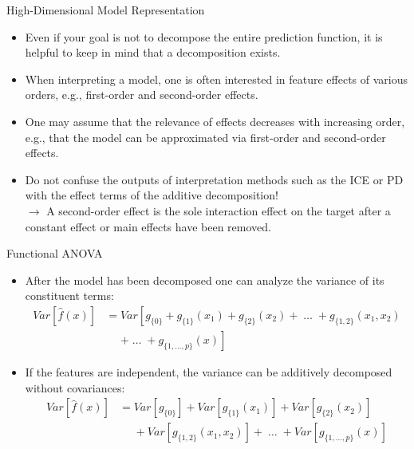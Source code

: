 \documentclass[11pt,compress,t,notes=noshow, aspectratio=169, xcolor=table]{beamer}
\begin{document}
\begin{frame}{High-Dimensional Model Representation}

\begin{itemize}
\itemsep2em
    \item Even if your goal is not to decompose the entire prediction function, it is helpful to keep in mind that a decomposition exists.
    \item When interpreting a model, one is often interested in feature effects of various orders, e.g., first-order and second-order effects.
    \item One may assume that the relevance of effects decreases with increasing order, e.g., that the model can be approximated via first-order and second-order effects.
    \item Do not confuse the outputs of interpretation methods such as the ICE or PD with the effect terms of the additive decomposition!
    \\$\rightarrow$ A second-order effect is the sole interaction effect on the target after a constant effect or main effects have been removed.
\end{itemize}
\end{frame}


\begin{frame}{Functional ANOVA}

\begin{itemize}
\item After the model has been decomposed one can analyze the variance of its constituent terms:
\begin{align*}
Var\left[\hat{f}(x)\right] &= Var\left[g_{\{0\}} + g_{\{1\}}(x_1) + g_{\{2\}}(x_2) + \;\dots\; + g_{\{1, 2\}}(x_1, x_2) \right. \\
&\phantom{{}={}} \left. + \;\dots\; + g_{\{1,\ldots,p\}}(x) \right]
\end{align*}
\item If the features are independent, the variance can be additively decomposed without covariances:
\begin{align*}
Var\left[\hat{f}(x)\right] &= Var\left[g_{\{0\}}\right] + Var\left[g_{\{1\}}(x_1)\right] + Var\left[g_{\{2\}}(x_2)\right] \\
&\phantom{{}={}} + Var\left[g_{\{1, 2\}}(x_1, x_2)\right] + \;\dots\; + Var\left[g_{\{1,\ldots,p\}}(x)\right]
\end{align*}
\end{itemize}
\end{frame}
\end{document}

